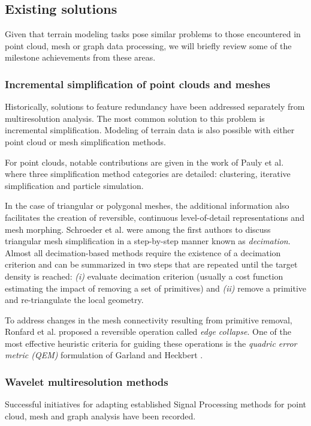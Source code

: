 \documentclass[graybox]{svmult}
\begin{document}
	
	\subsection{Existing solutions}
	Given that terrain modeling tasks pose similar problems to those encountered in point cloud, mesh or graph data processing, we will briefly review some of the milestone achievements from these areas.
	
	\subsubsection{Incremental simplification of point clouds and meshes}
	Historically, solutions to feature redundancy have been addressed separately from multiresolution analysis. The most common solution to this problem is incremental simplification. Modeling of terrain data is also possible with either point cloud or mesh simplification methods.
	
	For point clouds, notable contributions are given in the work of
	Pauly et al.  \cite{Pauly2002} where three simplification method categories are detailed: clustering, iterative simplification and particle simulation.
	
	In the case of triangular or polygonal meshes, the additional information
	also facilitates the creation of reversible, continuous level-of-detail representations and mesh morphing. Schroeder et al. \cite{Schroeder1992} were among the first authors to discuss triangular mesh simplification in a step-by-step manner known as \emph{decimation}. Almost all decimation-based methods require the existence of a decimation criterion and can be summarized in two steps that are repeated until the target density is reached:
	\emph{(i)} evaluate decimation criterion (usually a cost function estimating the impact of removing a set of primitives) and \emph{(ii)} remove a primitive and re-triangulate the local geometry.
	
	To address changes in the mesh connectivity resulting from primitive removal, Ronfard et al. \cite{Ronfard1996} proposed a reversible operation called \emph{edge collapse}. One of the most effective heuristic criteria for guiding these operations is the \emph{quadric error metric (QEM)} formulation of Garland and Heckbert \cite{Garland1998}.
	
	\subsubsection{Wavelet multiresolution methods}
	Successful initiatives for adapting established Signal Processing methods for
	point cloud, mesh and graph analysis have been recorded. 
	
\end{document}
